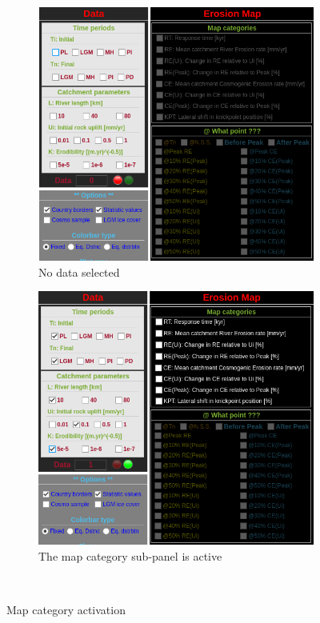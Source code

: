 \documentclass[11pt,a4paper,titlepage]{report}
\begin{document}
\begin{figure}[H]
    \centering
    \begin{subfigure}[H]{0.4\textwidth}
        \includegraphics[width=\textwidth]{em1.png}
        \caption{No data selected}
    \end{subfigure}
    \quad
    \begin{subfigure}[H]{0.4\textwidth}
        \includegraphics[width=\textwidth]{em2.png}
        \caption{The map category sub-panel is active}
    \end{subfigure}\\
    \caption[Map category activation]{Map category activation}
    \label{fig:mc_active}    
\end{figure}
\end{document}
